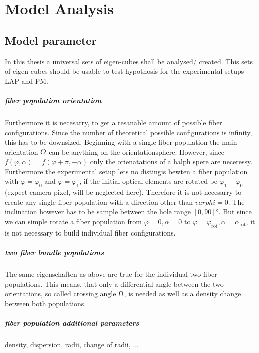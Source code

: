 \setcounter{chapter}{6}
\chapter{Model Analysis}
\label{cha:model_analysis}
% 
\section{Model parameter}
% 
In this thesis a universal sets of eigen-cubes shall be analysed/ created.
This sets of eigen-cubes should be usable to test hypothosis for the experimental setups \ac{LAP} and \ac{PM}.
\paragraph{fiber population orientation}
Furthermore it is necesarry, to get a resanable amount of possible fiber configurations.
Since the number of theoretical possible configurations is infinity, this has to be downsized.
Beginning with a single fiber population the main orientation $\textnormal{$O$}$ can be anything on the orientationsphere.
However, since $f(\varphi,\alpha) = f(\varphi+\pi,-\alpha)$ only the orienatations of a halph spere are neceressy.
Furthermore the experimental setup lets no distingis bewten a fiber population with $\varphi = \varphi_0$ and $\varphi = \varphi_1$, if the initial optical elements are rotated be $\varphi_1-\varphi_0$ (expect camera pixel, will be neglected here).
Therefore it is not necesarry to create any single fiber population with a direction other than $varphi = 0$.
The inclination however has to be sample between the hole range $[0,90]\si{\degree}$. But since we can simple rotate a fiber population from $\varphi=0, \alpha=0$ to $\varphi=\varphi_{\text{rot}}, \alpha=\alpha_{\text{rot}}$, it is not necessary to build individual fiber configurations.
% 
\paragraph{two fiber bundle populations}
The same eigenschaften as above are true for the individual two fiber populations. This means, that only a differential angle between the two orientations, so called crossing angle $\textnormal{$\Omega$}$, is needed as well as a density change between both populations. 
% 
\paragraph{fiber population additional parameters}
density, dispersion, radii, change of radii, ...
% 
% 

